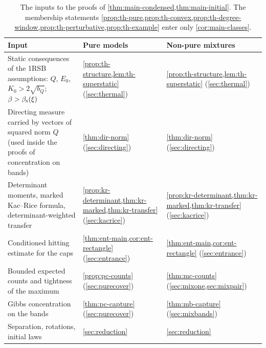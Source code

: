 \begin{table}[ht]
\centering
\small
\begin{tabular}{@{}>{\raggedright\arraybackslash}p{}>{\raggedright\arraybackslash}p{}>{\raggedright\arraybackslash}p{}@{}}
\toprule
Input & Pure models & Non-pure mixtures\\
\midrule
Static consequences of the 1RSB assumptions: $Q$, $E_0$, $K_0>2\sqrt{b_Q}$; $\beta>\beta_{\mathrm s}(\xi)$ & \cref{prop:th-structure,lem:th-superstatic} (\cref{sec:thermal}) & \cref{prop:th-structure,lem:th-superstatic} (\cref{sec:thermal})\\
Directing measure carried by vectors of squared norm $Q$ (used inside the proofs of concentration on bands) & \cref{thm:dir-norm} (\cref{sec:directing}) & \cref{thm:dir-norm} (\cref{sec:directing})\\
Determinant moments, marked Kac--Rice formula, determinant-weighted transfer & \cref{prop:kr-determinant,thm:kr-marked,thm:kr-transfer} (\cref{sec:kacrice}) & \cref{prop:kr-determinant,thm:kr-marked,thm:kr-transfer} (\cref{sec:kacrice})\\
Conditioned hitting estimate for the caps & \cref{thm:ent-main,cor:ent-rectangle} (\cref{sec:entrance}) & \cref{thm:ent-main,cor:ent-rectangle} (\cref{sec:entrance})\\
Bounded expected counts and tightness of the maximum & \cref{prop:pc-counts} (\cref{sec:purecover}) & \cref{thm:mc-counts} (\cref{sec:mixone,sec:mixpair})\\
Gibbs concentration on the bands & \cref{thm:pc-capture} (\cref{sec:purecover}) & \cref{thm:mb-capture} (\cref{sec:mixbands})\\
Separation, rotations, initial laws & \cref{sec:reduction} & \cref{sec:reduction}\\
\bottomrule
\end{tabular}
\caption{The inputs to the proofs of \cref{thm:main-condensed,thm:main-initial}. The membership statements \cref{prop:th-pure,prop:th-convex,prop:th-degree-window,prop:th-perturbative,prop:th-example} enter only \cref{cor:main-classes}.}
\label{tab:cp-inputs}
\end{table}

